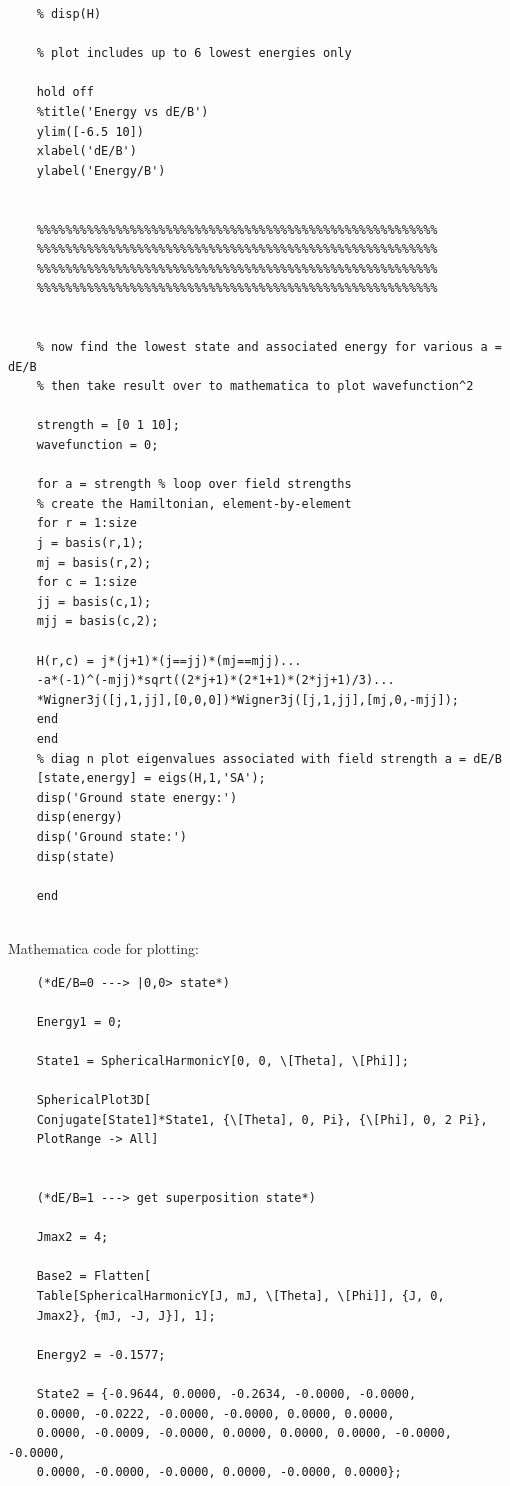 \documentclass{article}
\theoremstyle{definition}
\begin{document}
\begin{enumerate}[label=(\alph*)]
\begin{lstlisting}
	% disp(H)
	
	% plot includes up to 6 lowest energies only
	
	hold off
	%title('Energy vs dE/B')
	ylim([-6.5 10])
	xlabel('dE/B')
	ylabel('Energy/B')
	
	
	%%%%%%%%%%%%%%%%%%%%%%%%%%%%%%%%%%%%%%%%%%%%%%%%%%%%%%%%
	%%%%%%%%%%%%%%%%%%%%%%%%%%%%%%%%%%%%%%%%%%%%%%%%%%%%%%%%
	%%%%%%%%%%%%%%%%%%%%%%%%%%%%%%%%%%%%%%%%%%%%%%%%%%%%%%%%
	%%%%%%%%%%%%%%%%%%%%%%%%%%%%%%%%%%%%%%%%%%%%%%%%%%%%%%%%
	
	
	% now find the lowest state and associated energy for various a = dE/B
	% then take result over to mathematica to plot wavefunction^2
	
	strength = [0 1 10];
	wavefunction = 0;
	
	for a = strength % loop over field strengths
	% create the Hamiltonian, element-by-element
	for r = 1:size
	j = basis(r,1);
	mj = basis(r,2);
	for c = 1:size     
	jj = basis(c,1);  
	mjj = basis(c,2);
	
	H(r,c) = j*(j+1)*(j==jj)*(mj==mjj)...
	-a*(-1)^(-mjj)*sqrt((2*j+1)*(2*1+1)*(2*jj+1)/3)...
	*Wigner3j([j,1,jj],[0,0,0])*Wigner3j([j,1,jj],[mj,0,-mjj]);             
	end
	end
	% diag n plot eigenvalues associated with field strength a = dE/B
	[state,energy] = eigs(H,1,'SA');
	disp('Ground state energy:')
	disp(energy)
	disp('Ground state:')
	disp(state) 
	
	end
	
	\end{lstlisting}
	
	
	Mathematica code for plotting:
	\begin{lstlisting}
	(*dE/B=0 ---> |0,0> state*)
	
	Energy1 = 0;
	
	State1 = SphericalHarmonicY[0, 0, \[Theta], \[Phi]];
	
	SphericalPlot3D[
	Conjugate[State1]*State1, {\[Theta], 0, Pi}, {\[Phi], 0, 2 Pi}, 
	PlotRange -> All]
	
	
	(*dE/B=1 ---> get superposition state*)
	
	Jmax2 = 4;
	
	Base2 = Flatten[
	Table[SphericalHarmonicY[J, mJ, \[Theta], \[Phi]], {J, 0, 
	Jmax2}, {mJ, -J, J}], 1];
	
	Energy2 = -0.1577;
	
	State2 = {-0.9644, 0.0000, -0.2634, -0.0000, -0.0000,
	0.0000, -0.0222, -0.0000, -0.0000, 0.0000, 0.0000, 
	0.0000, -0.0009, -0.0000, 0.0000, 0.0000, 0.0000, -0.0000, -0.0000,
	0.0000, -0.0000, -0.0000, 0.0000, -0.0000, 0.0000};
	

\end{lstlisting}
\end{enumerate}
\end{document}
